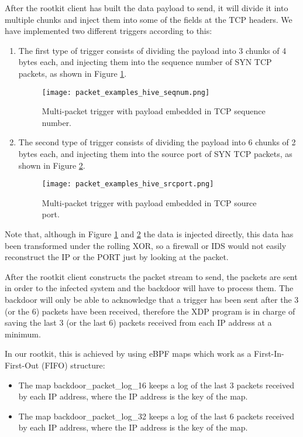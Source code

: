 After the rootkit client has built the data payload to send, it will divide it into multiple chunks and inject them into some of the fields at the TCP headers. We have implemented two different triggers according to this:
\begin{enumerate}
\item The first type of trigger consists of dividing the payload into 3 chunks of 4 bytes each, and injecting them into the sequence number of SYN TCP packets, as shown in Figure \ref{fig:hive_seqnum}.

\begin{figure}[htbp]
	\centering
	\texttt{[image: packet\_examples\_hive\_seqnum.png]}
	\caption{Multi-packet trigger with payload embedded in TCP sequence number.}
	\label{fig:hive_seqnum}
\end{figure}

\item The second type of trigger consists of dividing the payload into 6 chunks of 2 bytes each, and injecting them into the source port of SYN TCP packets, as shown in Figure \ref{fig:hive_srcport}.

\begin{figure}[htbp]
	\centering
	\texttt{[image: packet\_examples\_hive\_srcport.png]}
	\caption{Multi-packet trigger with payload embedded in TCP source port.}
	\label{fig:hive_srcport}
\end{figure}

\end{enumerate}

Note that, although in Figure \ref{fig:hive_seqnum} and \ref{fig:hive_srcport} the data is injected directly, this data has been transformed under the rolling XOR, so a firewall or IDS would not easily reconstruct the IP or the PORT just by looking at the packet.

After the rootkit client constructs the packet stream to send, the packets are sent in order to the infected system and the backdoor will have to process them. The backdoor will only be able to acknowledge that a trigger has been sent after the 3 (or the 6) packets have been received, therefore the XDP program is in charge of saving the last 3 (or the last 6) packets received from each IP address at a minimum.

In our rootkit, this is achieved by using eBPF maps which work as a First-In-First-Out (FIFO) structure:
\begin{itemize}
\item The map backdoor\_packet\_log\_16 keeps a log of the last 3 packets received by each IP address, where the IP address is the key of the map.
\item The map backdoor\_packet\_log\_32 keeps a log of the last 6 packets received by each IP address, where the IP address is the key of the map.
\end{itemize}

